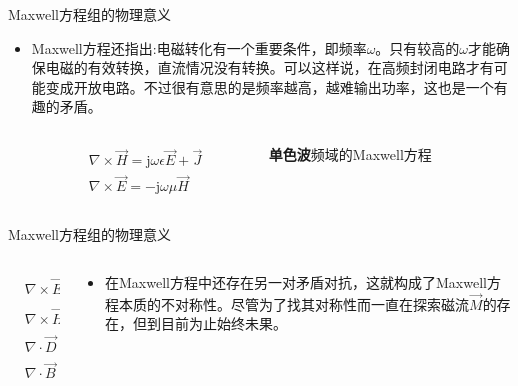 \begin{frame}{Maxwell方程组的物理意义}
  \begin{itemize}
    \item Maxwell方程还指出:电磁转化有一个重要条件，即频率$\omega$。只有较高的$\omega$才能确保电磁的有效转换，直流情况没有转换。可以这样说，在高频封闭电路才有可能变成开放电路。不过很有意思的是频率越高，越难输出功率，这也是一个有趣的矛盾。
          \begin{columns}
            \begin{column}{0.4\linewidth}
              \begin{align*}
                 & \nabla\times\vec{H} = \mathrm{j}\omega\epsilon\vec{E}+\vec{J} \\
                 & \nabla\times\vec{E} = -\mathrm{j}\omega\mu\vec{H}
              \end{align*}
            \end{column}
            \begin{column}{0.6\linewidth}
              \textbf{单色波}频域的Maxwell方程
            \end{column}
          \end{columns}
  \end{itemize}
\end{frame}

\begin{frame}{Maxwell方程组的物理意义}
  \begin{columns}
    \begin{column}{0.4\linewidth}
      \begin{align*}
         & \nabla\times\vec E=-\frac{\partial \vec B}{\partial t}         \\
         & \nabla\times\vec H=\vec{J} +\frac{\partial \vec D}{\partial t} \\
         & \nabla\cdot\vec{D}=\rho                                        \\
         & \nabla\cdot\vec{B}=0
      \end{align*}
    \end{column}
    \begin{column}{0.65\linewidth}
      \begin{itemize}
        \item 在Maxwell方程中还存在另一对矛盾对抗，这就构成了Maxwell方程本质的不对称性。尽管为了找其对称性而一直在探索磁流$\vec{M}$的存在，但到目前为止始终未果。
      \end{itemize}
    \end{column}
  \end{columns}
\end{frame}

